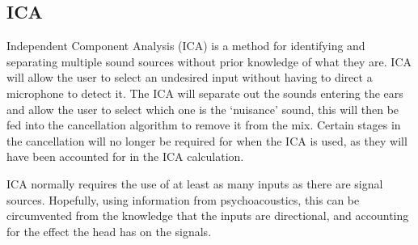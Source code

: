 \subsection{ICA}
Independent Component Analysis (ICA) is a method for identifying and separating multiple sound sources without prior knowledge of what they are.
ICA will allow the user to select an undesired input without having to direct a microphone to detect it.
The ICA will separate out the sounds entering the ears and allow the user to select which one is the `nuisance' sound, this will then be fed into the cancellation algorithm to remove it from the mix.
Certain stages in the cancellation will no longer be required for when the ICA is used, as they will have been accounted for in the ICA calculation.

ICA normally requires the use of at least as many inputs as there are signal sources\cite{AdvancedDSPing}.
Hopefully, using information from psychoacoustics, this can be circumvented from the knowledge that the inputs are directional, and accounting for the effect the head has on the signals.
